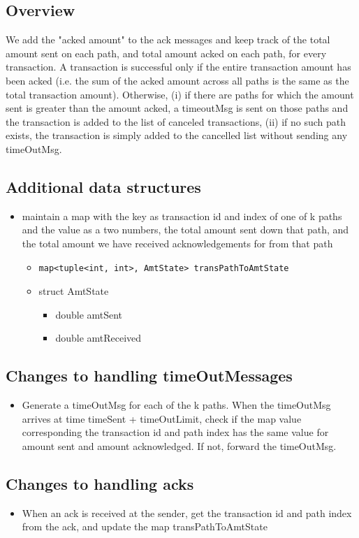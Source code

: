 \documentclass[a4paper]{article}
\begin{document}
\subsection{Overview}
We add the "acked amount" to the ack messages and keep track of the total amount sent on each path, and total amount acked on each path, for every transaction. A transaction is successful only if the entire transaction amount has been acked (i.e. the sum of the acked amount across all paths is the same as the total transaction amount). Otherwise, (i) if there are paths for which the amount sent is greater than the amount acked, a timeoutMsg is sent on those paths and the transaction is added to the list of canceled transactions, (ii) if no such path exists, the transaction is simply added to the cancelled list without sending any timeOutMsg.   

\subsection{Additional data structures}
\begin{itemize}
    \item maintain a map with the key as transaction id and index of one of k paths and the value as a two numbers, the total amount sent down that path, and the total amount we have received acknowledgements for from that path
    \begin{itemize}
        \item \begin{verbatim}map<tuple<int, int>, AmtState> transPathToAmtState \end{verbatim}
        \item struct AmtState
            \begin{itemize}
                \item double amtSent
                \item double amtReceived
            \end{itemize}
    \end{itemize}
\end{itemize}
\subsection{Changes to handling timeOutMessages}
\begin{itemize}
    \item Generate a timeOutMsg for each of the k paths. When the timeOutMsg arrives at time timeSent + timeOutLimit, check if the map value corresponding the transaction id and path index has the same value for amount sent and amount acknowledged. If not, forward the timeOutMsg.
\end{itemize}
\subsection{Changes to handling acks}
\begin{itemize}
    \item When an ack is received at the sender, get the transaction id and path index from the ack, and update the map transPathToAmtState
\end{itemize}
\end{document}
